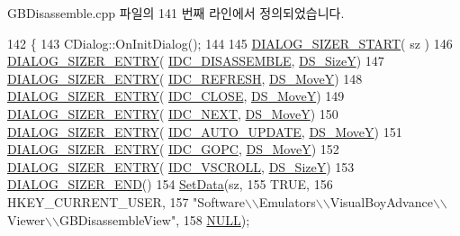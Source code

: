 G\+B\+Disassemble.\+cpp 파일의 141 번째 라인에서 정의되었습니다.


\begin{DoxyCode}
142 \{
143   CDialog::OnInitDialog();
144   
145   \mbox{\hyperlink{_resize_dlg_8h_acb9d1d22d9838f6dda8a61cfa132997c}{DIALOG\_SIZER\_START}}( sz )
146     \mbox{\hyperlink{_resize_dlg_8h_a0e9ee7a18c54003893895a009f5d79c8}{DIALOG\_SIZER\_ENTRY}}( \mbox{\hyperlink{resource_8h_a1e77bc2c6285101b4f86fb554e60299c}{IDC\_DISASSEMBLE}}, 
      \mbox{\hyperlink{_resize_dlg_8h_a783821ba6bb984916d55f46cdf90cb2b}{DS\_SizeY}})
147     \mbox{\hyperlink{_resize_dlg_8h_a0e9ee7a18c54003893895a009f5d79c8}{DIALOG\_SIZER\_ENTRY}}( \mbox{\hyperlink{resource_8h_ab2f366ad34063a7be9de1e2249dc705a}{IDC\_REFRESH}}, \mbox{\hyperlink{_resize_dlg_8h_ae5309071be822a4dae5cb33a131f6180}{DS\_MoveY}})
148     \mbox{\hyperlink{_resize_dlg_8h_a0e9ee7a18c54003893895a009f5d79c8}{DIALOG\_SIZER\_ENTRY}}( \mbox{\hyperlink{resource_8h_a27e7224faecfa4040c695a69107088f9}{IDC\_CLOSE}}, \mbox{\hyperlink{_resize_dlg_8h_ae5309071be822a4dae5cb33a131f6180}{DS\_MoveY}})
149     \mbox{\hyperlink{_resize_dlg_8h_a0e9ee7a18c54003893895a009f5d79c8}{DIALOG\_SIZER\_ENTRY}}( \mbox{\hyperlink{resource_8h_a0bef3b291371b0573bb0ba8987e8d6fa}{IDC\_NEXT}},  \mbox{\hyperlink{_resize_dlg_8h_ae5309071be822a4dae5cb33a131f6180}{DS\_MoveY}})
150     \mbox{\hyperlink{_resize_dlg_8h_a0e9ee7a18c54003893895a009f5d79c8}{DIALOG\_SIZER\_ENTRY}}( \mbox{\hyperlink{resource_8h_ad369b05206010ebec1c8a69a1dd1f141}{IDC\_AUTO\_UPDATE}}, 
      \mbox{\hyperlink{_resize_dlg_8h_ae5309071be822a4dae5cb33a131f6180}{DS\_MoveY}})
151     \mbox{\hyperlink{_resize_dlg_8h_a0e9ee7a18c54003893895a009f5d79c8}{DIALOG\_SIZER\_ENTRY}}( \mbox{\hyperlink{resource_8h_a09f50527734f41cb89a3fbd6bfd9b97c}{IDC\_GOPC}}, \mbox{\hyperlink{_resize_dlg_8h_ae5309071be822a4dae5cb33a131f6180}{DS\_MoveY}})
152     \mbox{\hyperlink{_resize_dlg_8h_a0e9ee7a18c54003893895a009f5d79c8}{DIALOG\_SIZER\_ENTRY}}( \mbox{\hyperlink{resource_8h_a420d68e24dfd23b92f4c35464790687e}{IDC\_VSCROLL}}, \mbox{\hyperlink{_resize_dlg_8h_a783821ba6bb984916d55f46cdf90cb2b}{DS\_SizeY}})
153     \mbox{\hyperlink{_resize_dlg_8h_aeac0c1e32f30e0763df5736e4b3ea50a}{DIALOG\_SIZER\_END}}()
154     \mbox{\hyperlink{class_resize_dlg_a6a3965f44a0c2f5ba9aaa798a9a81df5}{SetData}}(sz,
155             TRUE,
156             HKEY\_CURRENT\_USER,
157             "Software\(\backslash\)\(\backslash\)Emulators\(\backslash\)\(\backslash\)VisualBoyAdvance\(\backslash\)\(\backslash\)Viewer\(\backslash\)\(\backslash\)GBDisassembleView",
158             \mbox{\hyperlink{getopt1_8c_a070d2ce7b6bb7e5c05602aa8c308d0c4}{NULL}});

\end{DoxyCode}
